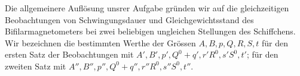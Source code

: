 Die allgemeinere Auflösung unsrer Aufgabe gründen wir auf die gleichzeitigen Beobachtungen von Schwingungsdauer und Gleichgewichtsstand des Bifilarmagnetometers bei zwei beliebigen ungleichen Stellungen des Schiffchens. Wir bezeichnen die bestimmten Werthe der Grössen $A,B,p,Q,R,S,t$\newline
\hspace*{.45em}für den ersten Satz der Beobachtungen mit $A',B',p',Q^0+q',r'R^0,s'S^0,t'$;\newline
\hspace*{.45em}für den zweiten Satz mit $A'',B'',p'',Q^0+q'',r''R^0,s''S^0,t''$.

